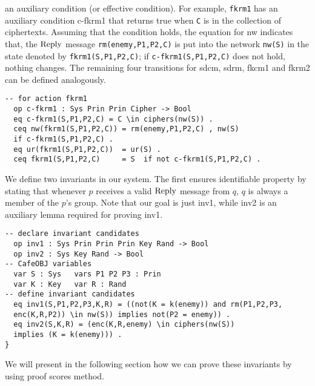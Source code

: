\documentclass[a4paper,fleqn]{cas-dc}
\begin{document}
an auxiliary condition (or effective condition). For example, \verb!fkrm1! has an auxiliary condition c-fkrm1 that returns true when \verb!C! is in the collection of ciphertexts. Assuming that the condition holds, the equation for nw indicates that, the $\rm Reply$ message \verb!rm(enemy,P1,P2,C)! is put into the network \verb!nw(S)! in the state denoted by \verb!fkrm1(S,P1,P2,C)!; if \verb!c-fkrm1(S,P1,P2,C)! does not hold, nothing changes.
The remaining four transitions for sdcm, sdrm, fkcm1 and fkrm2 can be defined analogously.
\begin{small}
\begin{verbatim}
-- for action fkrm1
  op c-fkrm1 : Sys Prin Prin Cipher -> Bool
  eq c-fkrm1(S,P1,P2,C) = C \in ciphers(nw(S)) .
  ceq nw(fkrm1(S,P1,P2,C)) = rm(enemy,P1,P2,C) , nw(S) 
  if c-fkrm1(S,P1,P2,C) .
  eq ur(fkrm1(S,P1,P2,C))  = ur(S) .
  ceq fkrm1(S,P1,P2,C)     = S  if not c-fkrm1(S,P1,P2,C) .
\end{verbatim}
\end{small}
We define two invariants in our system. The first ensures identifiable property by stating that whenever $p$ receives a valid $\rm Reply$ message from $q$, $q$ is always a member of the $p$'s group. Note that our goal is just inv1, while inv2 is an auxiliary lemma required for proving inv1.
\begin{small}
\begin{verbatim}
-- declare invariant candidates
  op inv1 : Sys Prin Prin Prin Key Rand -> Bool
  op inv2 : Sys Key Rand -> Bool
-- CafeOBJ variables
  var S : Sys   vars P1 P2 P3 : Prin
  var K : Key   var R : Rand
-- define invariant candidates
  eq inv1(S,P1,P2,P3,K,R) = ((not(K = k(enemy)) and rm(P1,P2,P3,
  enc(K,R,P2)) \in nw(S)) implies not(P2 = enemy)) .
  eq inv2(S,K,R) = (enc(K,R,enemy) \in ciphers(nw(S)) 
  implies (K = k(enemy))) .
}
\end{verbatim}
\end{small}
We will present in the following section how we can prove these invariants by using proof scores method.
\end{document}
